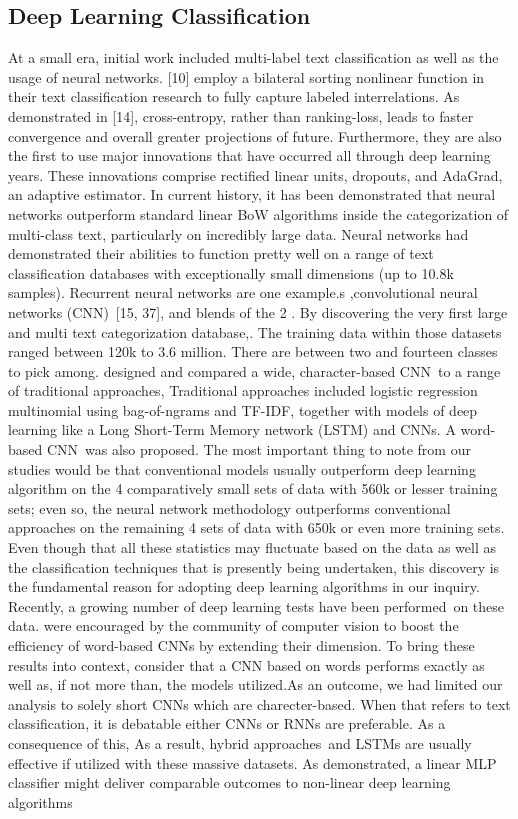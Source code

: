\documentclass[a4paper]{article}
\begin{document}
\subsection{Deep Learning Classification}
At a small era, initial work included multi-label text classification as well as the usage of neural networks. [10] employ a bilateral sorting nonlinear function in their text classification research to fully capture labeled interrelations. As demonstrated in [14], cross-entropy, rather than ranking-loss, leads to faster convergence and overall greater projections of future. Furthermore, they are also the first to use major innovations that have occurred all through deep learning years. These innovations comprise rectified linear units, dropouts, and AdaGrad, an adaptive estimator. In current history, it has been demonstrated that neural networks outperform standard linear BoW algorithms inside the categorization of multi-class text, particularly on incredibly large data. Neural networks had demonstrated their abilities to function pretty well on a range of text classification databases with exceptionally small dimensions (up to 10.8k samples). Recurrent neural networks are one example.s \cite{bib9},convolutional neural networks (CNN) [15, 37], and blends of the 2 \cite{bib9}. By discovering the very first large and multi text categorization database,\cite{bib10}. The training data within those datasets ranged between 120k to 3.6 million. There are between two and fourteen classes to pick among. \cite{bib12} designed and compared a wide, character-based CNN to a range of traditional approaches, Traditional approaches included logistic regression multinomial using bag-of-ngrams and TF-IDF, together with models of deep learning like a Long Short-Term Memory network (LSTM) and CNNs. \cite{bib12} A word-based CNN was also proposed. The most important thing to note from our studies would be that conventional models usually outperform deep learning algorithm on the 4 comparatively small sets of data with 560k or lesser training sets; even so, the neural network methodology outperforms conventional approaches on the remaining 4 sets of data with 650k or even more training sets. Even though that all these statistics may fluctuate based on the data as well as the classification techniques that is presently being undertaken, this discovery is the fundamental reason for adopting deep learning algorithms in our inquiry. Recently, a growing number of deep learning tests have been performed on these data. \cite{bib13} were encouraged by the community of computer vision to boost the efficiency of word-based CNNs by extending their dimension. To bring these results into context, \cite{bib11}  consider that a CNN based on words performs exactly as well as, if not more than, the models utilized.As an outcome, we had limited our analysis to solely short CNNs which are charecter-based. When that refers to text classification, \cite{bib10}  it is debatable either CNNs or RNNs are preferable. As a consequence of this, As a result, hybrid approaches and LSTMs \cite{bib3, bib6} are usually effective if utilized with these massive datasets. As demonstrated, a linear MLP classifier might deliver comparable outcomes to non-linear deep learning algorithms 
\end{document}
